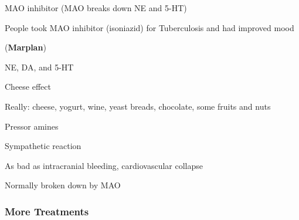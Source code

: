 \begin{coloredlist}
\begin{coloredlist}
\begin{coloredlist}
        \end{coloredlist}
        \item MAO inhibitor (MAO breaks down NE and 5-HT)
        \begin{coloredlist}
            \item People took MAO inhibitor (isoniazid) for Tuberculosis and had improved mood
            \item {} (\textbf{Marplan})
        \end{coloredlist}
        \item NE, DA, and 5-HT
        \item Cheese effect
        \begin{coloredlist}
            \item Really: cheese, yogurt, wine, yeast breads, chocolate, some fruits and nuts
        \end{coloredlist}
    \end{coloredlist}
    \item Pressor amines
    \begin{coloredlist}
        \item Sympathetic reaction
        \begin{coloredlist}
            \item As bad as intracranial bleeding, cardiovascular collapse
        \end{coloredlist}
        \item Normally broken down by MAO
    \end{coloredlist}
\end{coloredlist}



\subsubsection{More Treatments}

